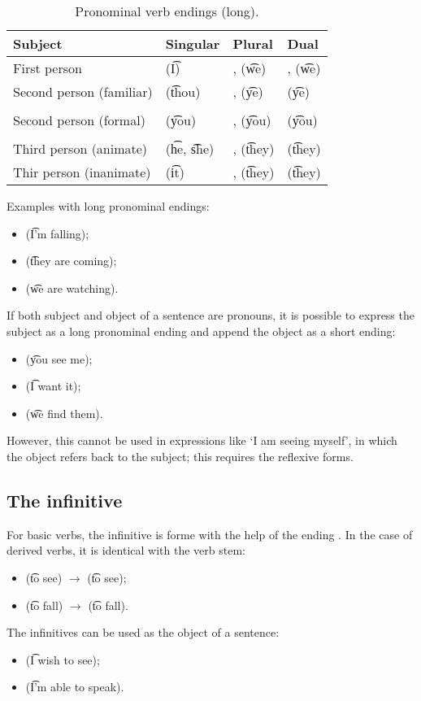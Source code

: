 \begin{table}
\centering
\caption{Pronominal verb endings (long).}
\label{tab:pronominal-verb-endings-long}
\begin{tabular}{llll}
\toprule
Subject & Singular & Plural & Dual \\
\midrule
First person & \q{} (\t{I}) & \q{}, \q{} (\t{we}) & \q{},
\q{} (\t{we}) \\
Second person (familiar) & \q{} (\t{thou}) & \q{}, \q{} (\t{ye}) &
\q{} (\t{ye}) \\
\\
Second person (formal) & \q{} (\t{you}) & \q{}, \q{} (\t{you}) &
\q{} (\t{you}) \\ \\
Third person (animate) & \q{} (\t{he}, \t{she}) & \q{}, \q{}
(\t{they}) & \q{} (\t{they}) \\
Thir person (inanimate) & \q{} (\t{it}) & \q{}, \q{} (\t{they}) &
\q{} (\t{they}) \\
\bottomrule
\end{tabular}
\end{table}

Examples with long pronominal endings:
\begin{itemize}
  \item {} (\t{I'm falling});
  \item {} (\t{they are coming});
  \item {} (\t{we are watching}).
\end{itemize}
If both subject and object of a sentence are pronouns, it is possible to express
the subject as a long pronominal ending and append the object as a short ending:
\begin{itemize}
  \item {} (\t{you see me});
  \item {} (\t{I want it});
  \item {} (\t{we find them}).
\end{itemize}
However, this cannot be used in expressions like `I am seeing myself', in which
the object refers back to the subject; this requires the reflexive forms.

\subsection{The infinitive}
For basic verbs, the infinitive is forme with the help of the ending . In
the case of derived verbs, it is identical with the verb stem:
\begin{itemize}
  \item {} (\t{to see}) $\rightarrow$  (\t{to see});
  \item {} (\t{to fall}) $\rightarrow$  (\t{to fall}).
\end{itemize}
The infinitives can be used as the object of a sentence:
\begin{itemize}
  \item {} (\t{I wish to see});
  \item {} (\t{I'm able to speak}).
\end{itemize}

